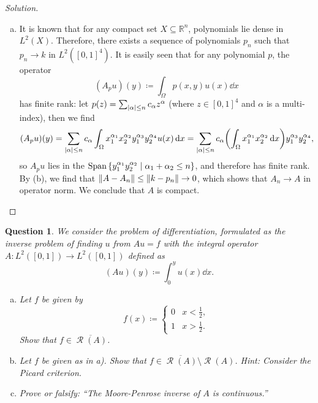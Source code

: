 \documentclass{article}
\theoremstyle{plain}
\newtheorem{question}{Question}
\theoremstyle{remark}
\newenvironment{solution}{\begin{proof}[Solution]\renewcommand\qedsymbol{}}{\end{proof}}
\newcommand{\Bb}{\mathbb}
\newcommand{\Cal}{\mathcal}
\newcommand{\RR}{\Bb R}
\newcommand\ceq\coloneqq %
\newcommand\clos\overline
\DeclareMathOperator{\Span}{Span}
\DeclareMathOperator\Ran{\Cal R}
\begin{document}
\begin{solution}
\begin{enumerate}[(a)]
\item It is known that for any compact set $X \subseteq \RR^n$, polynomials lie dense in $L^2(X)$. Therefore, there exists a sequence of polynomials $p_n$ such that $p_n \to k$ in $L^2([0, 1]^4)$. It is easily seen that for any polynomial $p$, the operator
\[
(A_p u)(y) \ceq \int_\Omega p(x, y) u(x) \dd{x} 
\] 
has finite rank: let $p(z) = \sum_{\abs{\alpha} \leq n} c_\alpha z^\alpha$ (where $z \in [0, 1]^4$ and $\alpha$ is a multi-index), then we find
\[
(A_p u)(y) = \sum_{\abs{\alpha} \leq n} c_\alpha \int_\Omega x_1^{\alpha_1} x_2^{\alpha_2} y_1^{\alpha_3} y_2^{\alpha_4} u(x) \dd{x} = \sum_{\abs{\alpha} \leq n} c_\alpha \qty(\int_\Omega x_1^{\alpha_1} x_2^{\alpha_2} \dd{x}) y_1^{\alpha_3} y_2^{\alpha_4},
\]
so $A_p u$ lies in the $\Span\qty{y_1^{\alpha_1} y_2^{\alpha_2} \mid \alpha_1 + \alpha_2 \leq n}$, and therefore has finite rank. 
By (b), we find that $\norm{A - A_n} \leq \norm{k - p_n} \to 0$, which shows that $A_n \to A$ in operator norm. We conclude that $A$ is compact. 
	\end{enumerate}
\end{solution}

\begin{question}
	We consider the problem of differentiation, formulated as the inverse problem of finding $u$ from $Au = f$ with the integral operator $A \colon L^2([0, 1]) \to L^2([0, 1])$ defined as
	\[
	(Au)(y) \ceq \int_0^y u(x) \dd{x}.
	\]
	
	\begin{enumerate}[(a)]
		\item Let $f$ be given by
		\[
		f(x) \ceq \begin{cases} 0 & x < \frac12, \\ 1 &x > \frac12. \end{cases}
		\]
		Show that $f \in \clos{\Ran(A)}$. 
		\item Let $f$ be given as in a). Show that $f \in \clos{\Ran(A)} \setminus \Ran(A)$. \emph{Hint: Consider the Picard criterion}. 
		
		\item Prove or falsify: ``The Moore-Penrose inverse of $A$ is continuous.''
	\end{enumerate}
\end{question}
\end{document}
